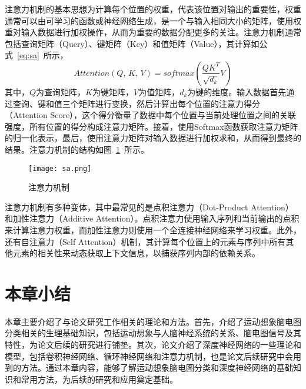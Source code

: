注意力机制的基本思想为计算每个位置的权重，代表该位置对输出的重要性，权重通常可以由可学习的函数或神经网络生成，是一个与输入相同大小的矩阵，使用权重对输入数据进行加权操作，从而为重要的数据分配更多的关注。注意力机制通常包括查询矩阵（Query）、键矩阵（Key）和值矩阵（Value），其计算如公式~\ref{eq:sa}~所示，
\begin{equation}\label{eq:sa}
    Attention(Q,\,K,\,V)=softmax(\frac{QK^{T}}{\sqrt{d_k}}V)
\end{equation}
其中，\(Q\)为查询矩阵，\(K\)为键矩阵，\(V\)为值矩阵，\(d_k\)为键的维度。输入数据首先通过查询、键和值三个矩阵进行变换，然后计算出每个位置的注意力得分（Attention Score），这个得分衡量了数据中每个位置与当前处理位置之间的关联强度，所有位置的得分构成注意力矩阵。接着，使用Softmax函数获取注意力矩阵的归一化表示，最后，使用注意力矩阵对输入数据进行加权求和，从而得到最终的结果。注意力机制的结构如图~\ref{fig:sa}~所示。
\begin{figure}[ht]
    \centering
    \texttt{[image: sa.png]}
    \caption{注意力机制}
    \label{fig:sa}
\end{figure}

注意力机制有多种变体，其中最常见的是点积注意力（Dot-Product Attention）和加性注意力（Additive Attention）。点积注意力使用输入序列和当前输出的点积来计算注意力权重，而加性注意力则使用一个全连接神经网络来学习权重。此外，还有自注意力\cite{vaswani2017attention}（Self Attention）机制，其计算每个位置上的元素与序列中所有其他元素的相关性来动态获取上下文信息，以捕获序列内部的依赖关系。

\section{本章小结}

本章主要介绍了与论文研究工作相关的理论和方法。首先，介绍了运动想象脑电图分类相关的生理基础知识，包括运动想象与人脑神经系统的关系、脑电图信号及其特性，为论文后续的研究进行铺垫。其次，论文介绍了深度神经网络的一些理论和模型，包括卷积神经网络、循环神经网络和注意力机制，也是论文后续研究中会用到的方法。通过本章内容，能够了解运动想象脑电图分类和深度神经网络的基础知识和常用方法，为后续的研究和应用奠定基础。